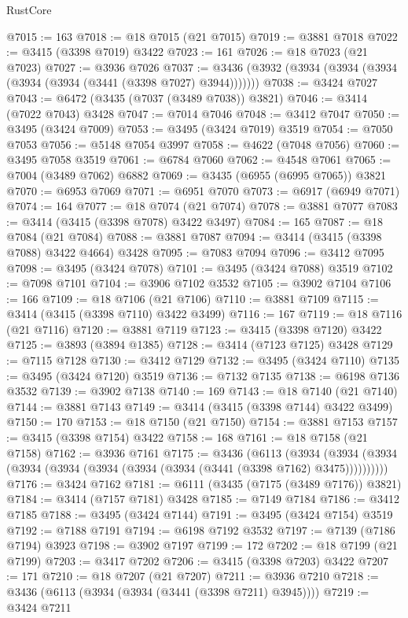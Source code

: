 \begin{lexlean}{RustCore}
\begin{coremodule}
@7015 := 163
@7018 := @18 @7015 (@21 @7015)
@7019 := @3881 @7018
@7022 := @3415 (@3398 @7019) @3422
@7023 := 161
@7026 := @18 @7023 (@21 @7023)
@7027 := @3936 @7026
@7037 := @3436 (@3932 (@3934 (@3934 (@3934 (@3934 (@3934 (@3441 (@3398 @7027) @3944)))))))
@7038 := @3424 @7027
@7043 := @6472 (@3435 (@7037 (@3489 @7038)) @3821)
@7046 := @3414 (@7022 @7043) @3428
@7047 := @7014 @7046
@7048 := @3412 @7047
@7050 := @3495 (@3424 @7009)
@7053 := @3495 (@3424 @7019) @3519
@7054 := @7050 @7053
@7056 := @5148 @7054 @3997
@7058 := @4622 (@7048 @7056)
@7060 := @3495 @7058 @3519
@7061 := @6784 @7060
@7062 := @4548 @7061
@7065 := @7004 (@3489 @7062) @6882
@7069 := @3435 (@6955 (@6995 @7065)) @3821
@7070 := @6953 @7069
@7071 := @6951 @7070
@7073 := @6917 (@6949 @7071)
@7074 := 164
@7077 := @18 @7074 (@21 @7074)
@7078 := @3881 @7077
@7083 := @3414 (@3415 (@3398 @7078) @3422 @3497)
@7084 := 165
@7087 := @18 @7084 (@21 @7084)
@7088 := @3881 @7087
@7094 := @3414 (@3415 (@3398 @7088) @3422 @4664) @3428
@7095 := @7083 @7094
@7096 := @3412 @7095
@7098 := @3495 (@3424 @7078)
@7101 := @3495 (@3424 @7088) @3519
@7102 := @7098 @7101
@7104 := @3906 @7102 @3532
@7105 := @3902 @7104
@7106 := 166
@7109 := @18 @7106 (@21 @7106)
@7110 := @3881 @7109
@7115 := @3414 (@3415 (@3398 @7110) @3422 @3499)
@7116 := 167
@7119 := @18 @7116 (@21 @7116)
@7120 := @3881 @7119
@7123 := @3415 (@3398 @7120) @3422
@7125 := @3893 (@3894 @1385)
@7128 := @3414 (@7123 @7125) @3428
@7129 := @7115 @7128
@7130 := @3412 @7129
@7132 := @3495 (@3424 @7110)
@7135 := @3495 (@3424 @7120) @3519
@7136 := @7132 @7135
@7138 := @6198 @7136 @3532
@7139 := @3902 @7138
@7140 := 169
@7143 := @18 @7140 (@21 @7140)
@7144 := @3881 @7143
@7149 := @3414 (@3415 (@3398 @7144) @3422 @3499)
@7150 := 170
@7153 := @18 @7150 (@21 @7150)
@7154 := @3881 @7153
@7157 := @3415 (@3398 @7154) @3422
@7158 := 168
@7161 := @18 @7158 (@21 @7158)
@7162 := @3936 @7161
@7175 := @3436
    (@6113
      (@3934 (@3934 (@3934 (@3934 (@3934 (@3934 (@3934 (@3934 (@3441 (@3398 @7162) @3475))))))))))
@7176 := @3424 @7162
@7181 := @6111 (@3435 (@7175 (@3489 @7176)) @3821)
@7184 := @3414 (@7157 @7181) @3428
@7185 := @7149 @7184
@7186 := @3412 @7185
@7188 := @3495 (@3424 @7144)
@7191 := @3495 (@3424 @7154) @3519
@7192 := @7188 @7191
@7194 := @6198 @7192 @3532
@7197 := @7139 (@7186 @7194) @3923
@7198 := @3902 @7197
@7199 := 172
@7202 := @18 @7199 (@21 @7199)
@7203 := @3417 @7202
@7206 := @3415 (@3398 @7203) @3422
@7207 := 171
@7210 := @18 @7207 (@21 @7207)
@7211 := @3936 @7210
@7218 := @3436 (@6113 (@3934 (@3934 (@3441 (@3398 @7211) @3945))))
@7219 := @3424 @7211

\end{coremodule}
\end{lexlean}
